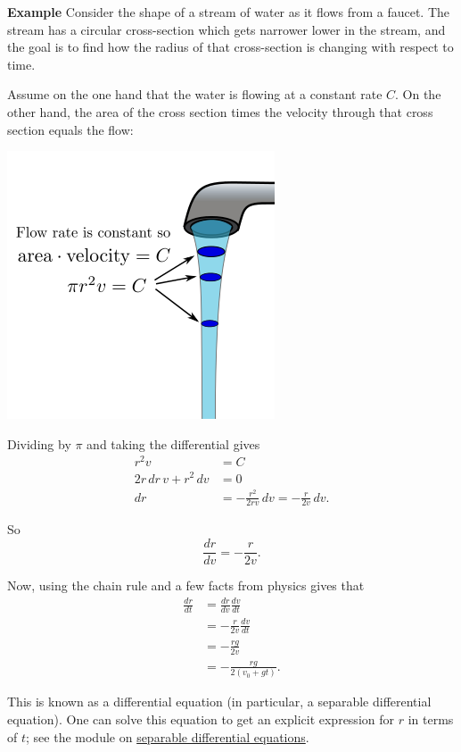 \documentclass[twoside,openright,titlepage,a4paper]{book}
\begin{document}
\begin{sloppypar}
\textbf{Example} Consider the shape of a stream of water as it flows from a faucet. The stream has a circular cross-section which gets narrower lower in the stream, and the goal is to find how the radius of that cross-section is changing with respect to time.

Assume on the one hand that the water is flowing at a constant rate $C$. On the other hand, the area of the cross section times the velocity through that cross section equals the flow:
\begin{center}\includegraphics[scale=0.6]{Faucet}\end{center}

Dividing by $\pi$ and taking the differential gives
\begin{align*}
r^2 v &= C \\
2r \, dr \, v + r^2 \, dv &= 0 \\
dr &= -\frac{r^2}{2rv} \, dv = -\frac{r}{2v} \, dv.
\end{align*}

So \[ \frac{dr}{dv} = -\frac{r}{2v}. \]

Now, using the chain rule and a few facts from physics gives that
\begin{align*}
\frac{dr}{dt} &= \frac{dr}{dv} \frac{dv}{dt} \\
&= -\frac{r}{2v} \frac{dv}{dt} \\
&= -\frac{rg}{2v} \\
&= -\frac{rg}{2(v_0 + gt)}.
\end{align*}

This is known as a differential equation (in particular, a separable differential equation). One can solve this equation to get an explicit expression for $r$ in terms of $t$; see the module on \hyperref[ChIntegrationSecMoreDifferentialEquationsSubsecSeparableDifferentialEquations]{separable differential equations}.


\end{sloppypar}
\end{document}
